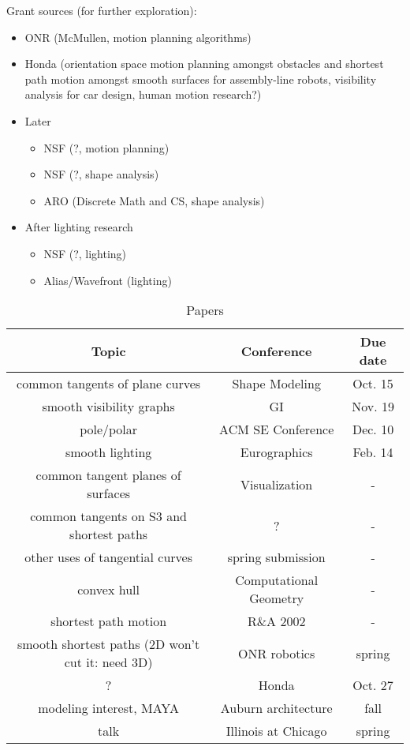 \documentclass[11pt,titlepage]{article}
\begin{document}
%
Grant sources (for further exploration):
\begin{itemize}
\item	ONR (McMullen, motion planning algorithms)
\item	Honda (orientation space motion planning amongst obstacles 
	and shortest path motion amongst smooth surfaces for 
	assembly-line robots, visibility analysis for car design, 
	human motion research?)
\item   Later
\begin{itemize}
\item   NSF (?, motion planning)
\item   NSF (?, shape analysis)
\item   ARO (Discrete Math and CS, shape analysis)
\end{itemize}
\item   After lighting research
\begin{itemize}
\item   NSF (?, lighting)
\item   Alias/Wavefront (lighting)
\end{itemize}
\end{itemize}

\begin{table}
\begin{tabular}{|c|c|c|}  	\hline
Topic & Conference & Due date \\ \hline
common tangents of plane curves & 	Shape Modeling & Oct. 15 \\ \hline
smooth visibility graphs & 	GI & Nov. 19 \\ \hline
pole/polar 		 & ACM SE Conference & Dec. 10 \\ \hline
smooth lighting &			Eurographics & Feb. 14\\ \hline
common tangent planes of surfaces &	Visualization & - \\ \hline
common tangents on S3 and shortest paths & ? & - \\ \hline
other uses of tangential curves	&	spring submission & - \\ \hline
convex hull &				Computational Geometry & - \\ \hline
shortest path motion &			R\&A 2002 & - \\ \hline
%
smooth shortest paths (2D won't cut it: need 3D) & ONR robotics & spring \\ \hline
? & Honda 		& Oct. 27 \\ \hline
modeling interest, MAYA &		Auburn architecture & fall \\ \hline
talk	& Illinois at Chicago & spring \\ \hline
\end{tabular}
\caption{Papers}
\end{table}
\end{document}
